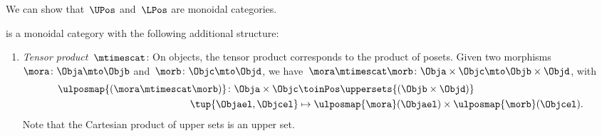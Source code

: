 We can show that~$\UPos$ and~$\LPos$ are monoidal categories.


\begin{lemma}
\label{lem:upos_moncat}
\UPos is a monoidal category with the following additional structure:
\begin{enumerate}
    \item \emph{Tensor product~$\mtimescat$}: On objects, the tensor product corresponds to the product of posets.
    Given two morphisms~$\mora\colon \Obja\mto \Objb$ and~$\morb\colon \Objc\mto \Objd$, we have~$\mora \mtimescat \morb\colon  \Obja \times \Objc \mto \Objb\times \Objd$, with
    \begin{equation}
    \begin{aligned}
       \ulposmap{(\mora\mtimescat \morb)}\colon \Obja \times \Objc &\toinPos \uppersets{(\Objb\times \Objd)}\\
        \tup{\Objael,\Objcel}&\mapsto \ulposmap{\mora}(\Objael)\times \ulposmap{\morb}(\Objcel).
    \end{aligned}
    \end{equation}
    Note that the Cartesian product of upper sets is an upper set.


\end{enumerate}
\end{lemma}
